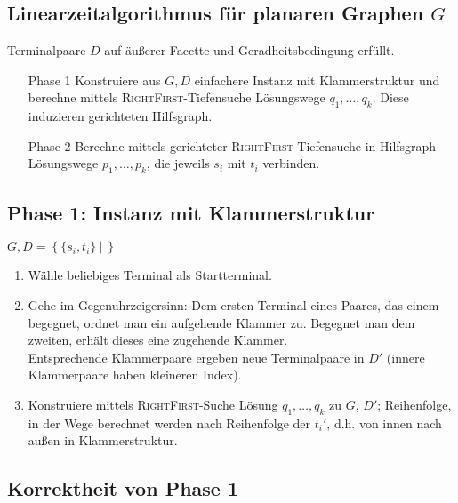 \documentclass{article}
\newcommand{\set}[2]{\left\lbrace #1~|~#2 \right\rbrace}
\begin{document}
\subsection{Linearzeitalgorithmus für planaren Graphen $G$}
Terminalpaare $D$ auf äußerer Facette und Geradheitsbedingung erfüllt.\\

\begin{enumerate}
	\item[Phase 1] Konstruiere aus $G, D$ einfachere Instanz mit Klammerstruktur und berechne mittels \textsc{RightFirst}-Tiefensuche Lösungswege $q_1, \ldots, q_k$. Diese induzieren gerichteten Hilfsgraph.
	\item[Phase 2] Berechne mittels gerichteter \textsc{RightFirst}-Tiefensuche in Hilfsgraph Lösungswege $p_1,\ldots, p_k$, die jeweils $s_i$ mit $t_i$ verbinden.
\end{enumerate}

\subsection{Phase 1: Instanz mit Klammerstruktur}
$G, D = \set{\{s_i,t_i\}}{}$
\begin{enumerate}
	\item Wähle beliebiges Terminal als Startterminal.
	\item Gehe im Gegenuhrzeigersinn: Dem ersten Terminal eines Paares, das einem begegnet, ordnet man ein aufgehende Klammer zu. Begegnet man dem zweiten, erhält dieses eine zugehende Klammer.\\
	Entsprechende Klammerpaare ergeben neue Terminalpaare in $D'$ (innere Klammerpaare haben kleineren Index).
	\item Konstruiere mittels \textsc{RightFirst}-Suche Lösung $q_1,\ldots, q_k$ zu $G$, $D'$; Reihenfolge, in der Wege berechnet werden nach Reihenfolge der $t_i'$, d.h. von innen nach außen in Klammerstruktur.
\end{enumerate}

\subsection{Korrektheit von Phase 1}
\end{document}
